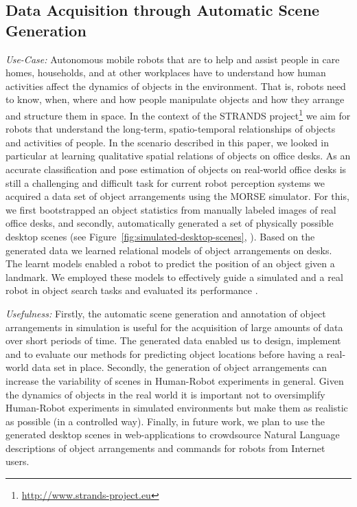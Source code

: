 \documentclass[conference]{IEEEtran}
\begin{document}
\subsection{Data Acquisition through Automatic Scene Generation}
\label{sc:generation}

\emph{Use-Case:} Autonomous mobile robots that are to help and assist people in
care homes, households, and at other workplaces have to understand how human
activities affect the dynamics of objects in the environment. That is, robots
need to know, when, where and how people manipulate objects and how they
arrange and structure them in space. In the context of the STRANDS
project\footnote{\url{http://www.strands-project.eu}} we aim for robots that
understand the long-term, spatio-temporal relationships of objects and
activities of people. In the scenario described in this paper, we looked in
particular at learning qualitative spatial relations of objects on office
desks. As an accurate classification and pose estimation of objects on
real-world office desks is still a challenging and difficult task for current
robot perception systems we acquired a data set of object arrangements using
the MORSE simulator. For this, we first bootstrapped an object statistics from
manually labeled images of real office desks, and secondly, automatically
generated a set of physically possible desktop scenes (see
Figure~\ref{fig:simulated-desktop-scenes}, \cite{kunze14bootstrapping}). Based
on the generated data we learned relational models of object arrangements on
desks. The learnt models enabled a robot to predict the position of an object
given a landmark. We employed these models to effectively guide a simulated and
a real robot in object search tasks and evaluated its performance
\cite{kunze14indirect}.

\emph{Usefulness:} Firstly, the automatic scene generation and annotation of
object arrangements in simulation is useful for the acquisition of large
amounts of data over short periods of time. The generated data enabled us to
design, implement and to evaluate our methods for predicting object locations
before having a real-world data set in place. Secondly, the generation of
object arrangements can increase the variability of scenes in Human-Robot
experiments in general. Given the dynamics of objects in the real world it is
important not to oversimplify Human-Robot experiments in simulated environments
but make them as realistic as possible (in a controlled way). Finally, in
future work, we plan to use the generated desktop scenes in web-applications to
crowdsource Natural Language descriptions of object arrangements and commands
for robots from Internet users.
\end{document}
